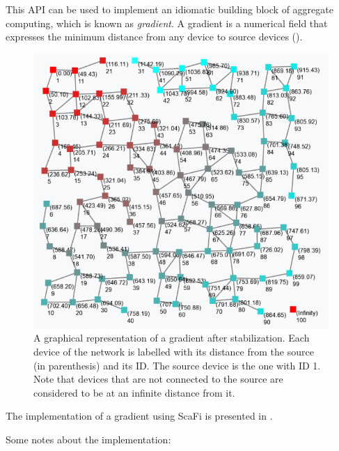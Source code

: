 This API can be used to implement an idiomatic building block of aggregate computing, which is known as \textit{gradient}.
%
A gradient is a numerical field that expresses the minimum distance from any device to source devices ().
%
\begin{figure}
    \centering
    \includegraphics[width=\textwidth]{figures/gradient-example.png}
    \caption
    {
        A graphical representation of a gradient after stabilization.
        Each device of the network is labelled with its distance from the source (in parenthesis) and its ID.
        The source device is the one with ID 1.
        Note that devices that are not connected to the source are considered to be at an infinite distance from it.
    }
    \label{fig:gradient}
\end{figure}
%
The implementation of a gradient using ScaFi is presented in .
%

%
Some notes about the implementation:
%
